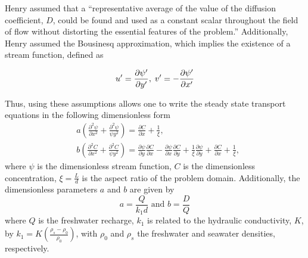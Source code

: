 Henry \cite{Henry60} assumed that a ``representative average of the value of the diffusion
coefficient, $D$, could be found and used as a constant scalar throughout the field of flow without
distorting the essential features of the problem.'' Additionally, Henry assumed the Bousinesq
approximation, which implies the existence of a stream function, defined as 

\begin{equation*}
    u'=\frac{\partial \psi'}{\partial y'},\; v'=-\frac{\partial \psi'}{\partial x'} 
\end{equation*} 

Thus, using these assumptions allows one to write the steady state transport equations in the
following dimensionless form 
\begin{align} 
  &a\left( \frac{\partial^2 \psi}{\partial x^2} + \frac{\partial^2 \psi}{\psi y^2} \right) =
    \frac{\partial C}{\partial x} + \frac{1}{\xi}, \label{eqn:Streamfunction}\\
  &b\left( \frac{\partial^2 C}{\partial x^2} + \frac{\partial^2 C}{\psi y^2} \right) =
    \frac{\partial \psi}{\partial y}\frac{\partial C}{\partial x} 
    - \frac{\partial \psi}{\partial x}\frac{\partial C}{\partial y} 
    + \frac{1}{\xi}\frac{\partial \psi}{\partial y} + \frac{\partial C}{\partial x} +
    \frac{1}{\xi}, \label{eqn:Concentration}
\end{align}
where $\psi$ is the dimensionless stream function, $C$ is the dimensionless concentration,
$\xi=\frac{L}{d}$ is the aspect ratio of the problem domain. Additionally, the dimensionless
parameters $a$ and $b$ are given by
\begin{equation} \label{eqn:ab}
  a =\frac{Q}{k_1 d} \text{ and } b = \frac{D}{Q} 
\end{equation}
where $Q$ is the freshwater recharge, $k_1$ is related to the hydraulic conductivity, $K$, by $k_1 =
K\left( \frac{\rho_s - \rho_0}{\rho_0} \right)$, with $\rho_0$ and $\rho_s$ the freshwater and
seawater densities, respectively.

